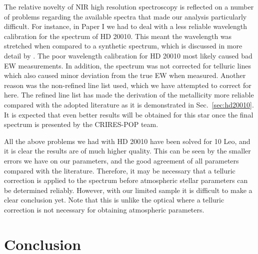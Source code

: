 \documentclass{aa}
\begin{document}
The relative novelty of NIR high resolution spectroscopy is reflected on a
number of problems regarding the available spectra that made our analysis
particularly difficult. For instance, in Paper I we had to deal with a less
reliable wavelength calibration for the spectrum of HD 20010. This meant the
wavelength was stretched when compared to a synthetic spectrum, which is
discussed in more detail by \citet{Nicholls2017}. The poor wavelength
calibration for HD 20010 most likely caused bad EW measurements. In addition,
the spectrum was not corrected for telluric lines which also caused minor
deviation from the true EW when measured. Another reason was the non-refined
line list used, which we have attempted to correct for here. The refined line
list has made the derivation of the metallicity more reliable compared with the
adopted literature as it is demonstrated in Sec.~\ref{sec:hd20010}. It is
expected that even better results will be obtained for this star once the final
spectrum is presented by the CRIRES-POP team.

All the above problems we had with HD 20010 have been solved for 10 Leo, and it
is clear the results are of much higher quality. This can be seen by the smaller
errors we have on our parameters, and the good agreement of all parameters
compared with the literature. Therefore, it may be necessary that a telluric
correction is applied to the spectrum before atmospheric stellar parameters can
be determined reliably. However, with our limited sample it is difficult to make
a clear conclusion yet. Note that this is unlike the optical where a telluric
correction is not necessary for obtaining atmospheric parameters.



\section{Conclusion}
\label{sec:conclusion}
\end{document}
